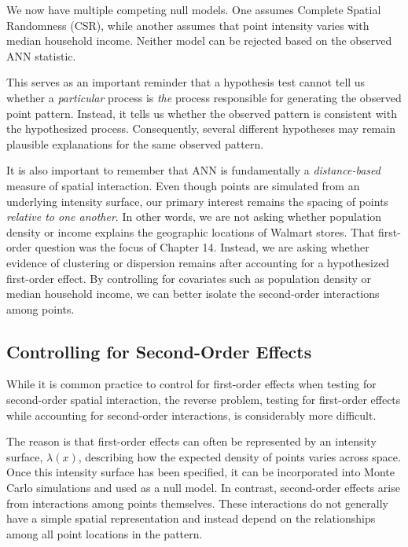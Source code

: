 \documentclass[
  letterpaper,
]{book}
\begin{document}
We now have multiple competing null models. One assumes Complete Spatial
Randomness (CSR), while another assumes that point intensity varies with
median household income. Neither model can be rejected based on the
observed ANN statistic.

This serves as an important reminder that a hypothesis test cannot tell
us whether a \emph{particular} process is \emph{the} process responsible
for generating the observed point pattern. Instead, it tells us whether
the observed pattern is consistent with the hypothesized process.
Consequently, several different hypotheses may remain plausible
explanations for the same observed pattern.

It is also important to remember that ANN is fundamentally a
\emph{distance-based} measure of spatial interaction. Even though points
are simulated from an underlying intensity surface, our primary interest
remains the spacing of points \emph{relative to one another}. In other
words, we are not asking whether population density or income explains
the geographic locations of Walmart stores. That first-order question
was the focus of Chapter 14. Instead, we are asking whether evidence of
clustering or dispersion remains after accounting for a hypothesized
first-order effect. By controlling for covariates such as population
density or median household income, we can better isolate the
second-order interactions among points.

\subsection{Controlling for Second-Order
Effects}\label{controlling-for-second-order-effects}

While it is common practice to control for first-order effects when
testing for second-order spatial interaction, the reverse problem,
testing for first-order effects while accounting for second-order
interactions, is considerably more difficult.

The reason is that first-order effects can often be represented by an
intensity surface, \(\lambda(x)\), describing how the expected density
of points varies across space. Once this intensity surface has been
specified, it can be incorporated into Monte Carlo simulations and used
as a null model. In contrast, second-order effects arise from
interactions among points themselves. These interactions do not
generally have a simple spatial representation and instead depend on the
relationships among all point locations in the pattern.
\end{document}
